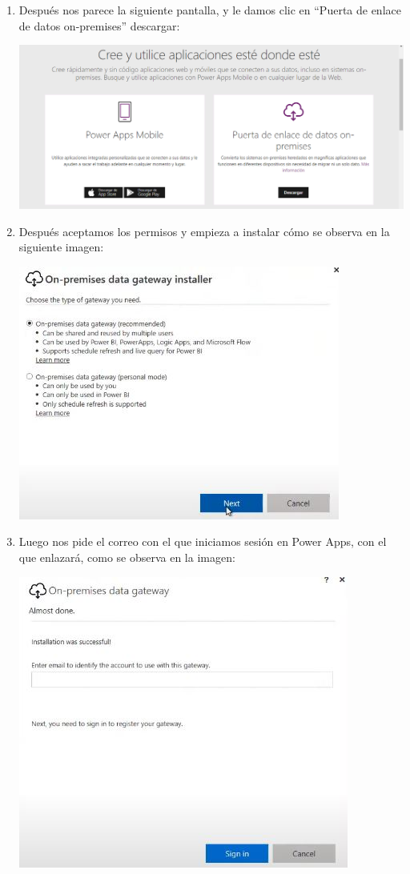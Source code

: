 \documentclass[letter,12pt]{article} %
\begin{document}
\begin{enumerate}
\begin{center}
\end{center} 
\newpage
\item Después nos parece la siguiente pantalla, y le damos clic en “Puerta de enlace de datos on-premises” descargar:
\begin{center} 
\includegraphics[scale=0.43]{imagenes/P06.png}
\end{center} 
\item Después aceptamos los permisos y empieza a instalar cómo se observa en la siguiente imagen:
\begin{center} 
\includegraphics[scale=0.95]{imagenes/P07.jpg}
\end{center} 
\newpage
\item Luego nos pide el correo con el que iniciamos sesión en Power Apps, con el que enlazará, como se observa en la imagen:
\begin{center} 
\includegraphics[scale=0.95]{imagenes/P08.jpg}

\end{center}
\end{enumerate}
\end{document}
